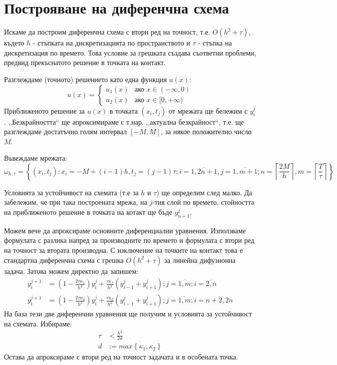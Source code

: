 \section{Построяване на диференчна схема}
Искаме да построим диференчна схема с втори ред на точност, т.е. $O(h^2 + \tau)$, където $h$ - стъпката на дискретизацията по пространството и $\tau$  - стъпка на дискретизация по времето.
Това условие за грешката създава съответни проблеми, предвид прекъснатото решение в точката на контакт.

\noindent Разглеждаме (точното) решението като една функция $u(x)$:
\begin{equation}
	u(x)=
	\begin{cases}
		u_1(x) & \text{ако } x \in (-\infty, 0) \\
		u_2(x) & \text{ако } x \in [0, +\infty) 
	\end{cases}
\end{equation}
Приближеното решение за $u(x)$ в точката $(x_i, t_j)$ от мрежата ще бележим с $y_{i}^{j}$. ,,Безкрайността`` ще апроксимираме с т.нар. ,,актуална безкрайност``, т.е. ще разглеждаме достатъчно голям интервал $[-M, M]$, за някое положително число $M$.

\noindent Въвеждаме мрежата:
\begin{equation*}
	\omega_{h, \tau } = \left\{ (x_i, t_j):  x_i = -M + (i-1) h, t_j = (j-1) \tau; i = \overline{1,2n+1}, j = \overline{1,m+1};  n = \left\lceil \frac{2M}{h} \right\rceil, m =\left\lceil \frac{T}{\tau} \right\rceil \right\}
\end{equation*}

\noindent Условията за устойчивост на схемата (т.е за $h$ и $\tau$) ще определим след малко.
Да забележим, че при така построената мрежа, на $j$-тия слой по времето, стойността на приближеното решение в точката на котакт ще бъде $y_{n+1}^j$.

Можем вече да апроксираме основните диференциални уравнения. Използваме формулата с разлика напред за производните по времето и формулата с втори ред на точност за втората производна.
С изключение на точките на контакт това е стандартна диференчна схема с грешка $O(h^2+\tau)$ за линейна дифузионна задача. Затова можем директно да запишем:
\begin{align}
	y_{i}^{j+1} & = \left(1-\frac{2 \tau \kappa_1}{h^2}\right)y_{i}^j + \frac{\tau \kappa_1}{h^2}\left(y_{i-1}^j + y_{i+1}^j\right); j = \overline{1, m}; i  = \overline{2, n}    \\
	y_{i}^{j+1} & = \left(1-\frac{2 \tau \kappa_2}{h^2}\right)y_{i}^j + \frac{\tau \kappa_2}{h^2}\left(y_{i-1}^j + y_{i+1}^j\right); j = \overline{1, m}; i  = \overline{n+2, 2n} 
\end{align}
На база тези две диференчни уравнения ще получим и условията за устойчивост на схемата. Избираме:
\begin{align*}
	\tau & < \frac{h^2}{2 d}                         \\
	d    & := max \left\{\kappa_1, \kappa_2 \right\} 
\end{align*}
Остава да апроксираме с втори ред на точност задачата и в особената точка.

